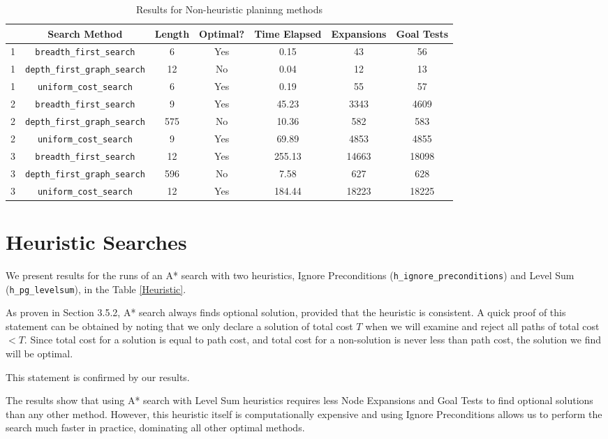 \documentclass[oneside]{article}   	%
\newcommand{\bfs}{\texttt{breadth\_first\_search}}
\newcommand{\dfs}{\texttt{depth\_first\_graph\_search}}
\newcommand{\ucs}{\texttt{uniform\_cost\_search}}
\newcommand{\hip}{\texttt{h\_ignore\_preconditions}}
\newcommand{\hpg}{\texttt{h\_pg\_levelsum}}
\begin{document}
\begin{table}[ht]
\caption{Results for Non-heuristic planinng methods}
\begin{center}
\begin{tabular}{c|c|ccccc}
   & Search Method & Length & Optimal? & Time Elapsed & Expansions & Goal Tests \\
   \hline
1 & \bfs & 6 & Yes & 0.15 & 43 & 56 \\
1 & \dfs & 12 & No & 0.04 & 12 & 13 \\
1 & \ucs & 6 & Yes & 0.19 & 55 & 57 \\
   \hline
2 & \bfs & 9 & Yes & 45.23 & 3343 & 4609 \\
2 & \dfs & 575 & No & 10.36 & 582 & 583 \\
2 & \ucs & 9 & Yes & 69.89 & 4853 & 4855 \\
   \hline
3 & \bfs & 12 & Yes & 255.13 & 14663 & 18098 \\
3 & \dfs & 596 & No & 7.58 & 627 & 628 \\
3 & \ucs & 12 & Yes & 184.44 & 18223 & 18225    
\end{tabular}
\end{center}
\label{NonHeuristic}
\end{table}%


\section{Heuristic Searches}

We present results for the runs of an A* search with two heuristics, Ignore Preconditions (\hip) and Level Sum (\hpg), in the Table \ref{Heuristic}. 

As proven in Section 3.5.2, A* search always finds optional solution, provided that the heuristic is consistent. A quick proof of this statement can be obtained by noting that we only declare a solution of total cost $T$ when we will examine and reject all paths of total cost $< T$. Since total cost for a solution is equal to path cost, and total cost for a non-solution is never less than path cost, the solution we find will be optimal.

This statement is confirmed by our results.

The results show that using A* search with Level Sum heuristics requires less Node Expansions and Goal Tests to find optional solutions than any other method. However, this heuristic itself is computationally expensive and using Ignore Preconditions allows us to perform the search much faster in practice, dominating all other optimal methods.
\end{document}
